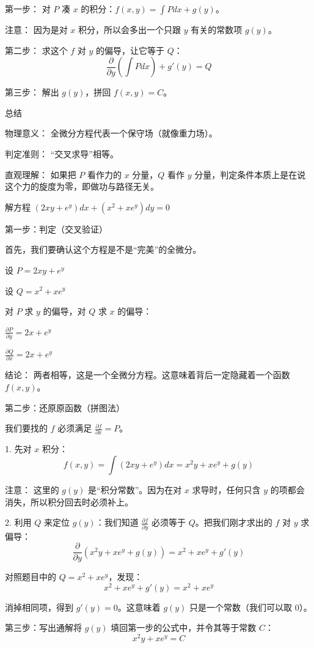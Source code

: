 第一步： 对 $P$ 凑 $x$ 的积分：$f(x, y) = \int P dx + g(y)$。

注意： 因为是对 $x$ 积分，所以会多出一个只跟 $y$ 有关的常数项 $g(y)$。

第二步： 求这个 $f$ 对 $y$ 的偏导，让它等于 $Q$：
$$\frac{\partial}{\partial y} \left( \int P dx \right) + g'(y) = Q$$

第三步： 解出 $g(y)$，拼回 $f(x, y) = C$。

总结

物理意义： 全微分方程代表一个保守场（就像重力场）。

判定准则： “交叉求导”相等。

直观理解： 如果把 $P$ 看作力的 $x$ 分量，$Q$ 看作 $y$ 分量，判定条件本质上是在说这个力的旋度为零，即做功与路径无关。

\begin{example} 解方程 $(2xy + e^y)dx + (x^2 + xe^y)dy = 0$

    第一步：判定（交叉验证）
    
    首先，我们要确认这个方程是不是“完美”的全微分。
    
    设 $P = 2xy + e^y$
    
    设 $Q = x^2 + xe^y$

    对 $P$ 求 $y$ 的偏导，对 $Q$ 求 $x$ 的偏导：
    
    $\frac{\partial P}{\partial y} = 2x + e^y$
    
    $\frac{\partial Q}{\partial x} = 2x + e^y$

    结论： 两者相等，这是一个全微分方程。这意味着背后一定隐藏着一个函数 $f(x,y)$。

    第二步：还原原函数（拼图法）
    
    我们要找的 $f$ 必须满足 $\frac{\partial f}{\partial x} = P$。
    
    1. 先对 $x$ 积分：
    $$f(x,y) = \int (2xy + e^y) dx = x^2y + xe^y + g(y)$$

    注意： 这里的 $g(y)$ 是“积分常数”。因为在对 $x$ 求导时，任何只含 $y$ 的项都会消失，所以积分回去时必须补上。

    2. 利用 $Q$ 来定位 $g(y)$：我们知道 $\frac{\partial f}{\partial y}$ 必须等于 $Q$。把我们刚才求出的 $f$ 对 $y$ 求偏导：
    $$\frac{\partial}{\partial y}(x^2y + xe^y + g(y)) = x^2 + xe^y + g'(y)$$

    对照题目中的 $Q = x^2 + xe^y$，发现：
    $$x^2 + xe^y + g'(y) = x^2 + xe^y$$

    消掉相同项，得到 $g'(y) = 0$。这意味着 $g(y)$ 只是一个常数（我们可以取 $0$）。
    
    第三步：写出通解将 $g(y)$ 填回第一步的公式中，并令其等于常数 $C$：
    $$x^2y + xe^y = C$$
\end{example}



